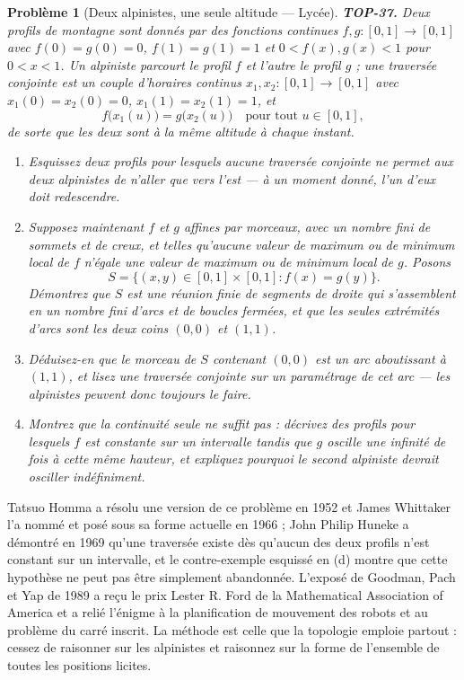 \documentclass[11pt]{article}
\newtheorem{problem}{Problème}
\begin{document}
\bigskip

\begin{problem}[{Deux alpinistes, une seule altitude --- Lycée}]
\textbf{TOP-37.} Deux profils de montagne sont donnés par des fonctions continues
$ f, g : [0,1] \to [0,1] $ avec $ f(0) = g(0) = 0 $, $ f(1) = g(1) = 1 $ et
$ 0 < f(x), g(x) < 1 $ pour $ 0 < x < 1 $. Un alpiniste parcourt le profil $ f $ et
l'autre le profil $ g $ ; une \textit{traversée conjointe} est un couple d'horaires continus
$ x_1, x_2 : [0,1] \to [0,1] $ avec $ x_1(0) = x_2(0) = 0 $, $ x_1(1) = x_2(1) = 1 $, et
\[ f\big(x_1(u)\big) = g\big(x_2(u)\big) \quad \text{pour tout } u \in [0,1] , \]
de sorte que les deux sont à la même altitude à chaque instant.
\begin{enumerate}
\item[(a)] Esquissez deux profils pour lesquels aucune traversée conjointe ne permet aux deux alpinistes de
n'aller que vers l'est --- à un moment donné, l'un d'eux doit redescendre.
\item[(b)] Supposez maintenant $ f $ et $ g $ affines par morceaux, avec un nombre fini de sommets et de
creux, et telles qu'aucune valeur de maximum ou de minimum local de $ f $ n'égale une valeur de
maximum ou de minimum local de $ g $. Posons
\[ S = \{ (x,y) \in [0,1] \times [0,1] : f(x) = g(y) \} . \]
Démontrez que $ S $ est une réunion finie de segments de droite qui s'assemblent en un nombre fini
d'arcs et de boucles fermées, et que les seules extrémités d'arcs sont les deux coins $ (0,0) $ et
$ (1,1) $.
\item[(c)] Déduisez-en que le morceau de $ S $ contenant $ (0,0) $ est un arc aboutissant à
$ (1,1) $, et lisez une traversée conjointe sur un paramétrage de cet arc --- les alpinistes peuvent
donc toujours le faire.
\item[(d)] Montrez que la continuité seule ne suffit pas : décrivez des profils pour lesquels $ f $ est
constante sur un intervalle tandis que $ g $ oscille une infinité de fois à cette même hauteur, et
expliquez pourquoi le second alpiniste devrait osciller indéfiniment.
\end{enumerate}

\end{problem}

\noindent Tatsuo Homma a résolu une version de ce problème en 1952 et James Whittaker l'a nommé
et posé sous sa forme actuelle en 1966 ; John Philip Huneke a démontré en 1969 qu'une traversée existe
dès qu'aucun des deux profils n'est constant sur un intervalle, et le contre-exemple esquissé en (d)
montre que cette hypothèse ne peut pas être simplement abandonnée. L'exposé de Goodman, Pach et Yap de
1989 a reçu le prix Lester R. Ford de la Mathematical Association of America et a relié l'énigme à la
planification de mouvement des robots et au problème du carré inscrit. La méthode est celle que la
topologie emploie partout : cessez de raisonner sur les alpinistes et raisonnez sur la forme de
l'ensemble de toutes les positions licites.
\end{document}

